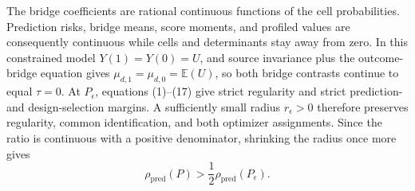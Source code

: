The bridge coefficients are rational continuous functions of the cell probabilities. Prediction risks, bridge means, score moments, and profiled values are consequently continuous while cells and determinants stay away from zero. In this constrained model \(Y(1)=Y(0)=U\), and source invariance plus the outcome-bridge equation gives \(\mu_{d,1}=\mu_{d,0}=\mathbb E(U)\), so both bridge contrasts continue to equal \(\tau=0\). At \(P_\epsilon\), equations (1)--(17) give strict regularity and strict prediction- and design-selection margins. A sufficiently small radius \(r_\epsilon>0\) therefore preserves regularity, common identification, and both optimizer assignments. Since the ratio is continuous with a positive denominator, shrinking the radius once more gives
\[
 \rho_{\mathrm{pred}}(P)>\frac12\rho_{\mathrm{pred}}(P_\epsilon).
\]